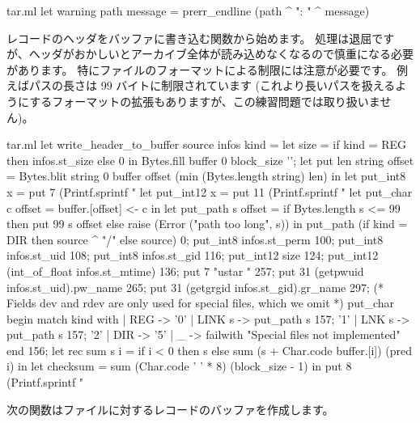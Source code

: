 \begin{answer}
\begin{listingcodefile}{tar.ml}
let warning path message =  prerr_endline (path ^ ": " ^ message)
\end{listingcodefile}
%
レコードのヘッダをバッファに書き込む関数から始めます。
処理は退屈ですが、ヘッダがおかしいとアーカイブ全体が読み込めなくなるので慎重になる必要があります。
特にファイルのフォーマットによる制限には注意が必要です。
例えばパスの長さは 99 バイトに制限されています
(これより長いパスを扱えるようにするフォーマットの拡張もありますが、この練習問題では取り扱いません)。
%
\begin{listingcodefile}{tar.ml}
let write_header_to_buffer source infos kind =
  let size = if kind = REG then infos.st_size else 0 in
  Bytes.fill buffer 0 block_size '';
  let put len string offset =
    Bytes.blit string 0 buffer offset (min (Bytes.length string) len) in
  let put_int8 x = put 7 (Printf.sprintf "%
  let put_int12 x = put 11 (Printf.sprintf "%
  let put_char c offset = buffer.[offset] <- c in
  let put_path s offset =
    if Bytes.length s <= 99 then put 99 s offset
    else raise (Error ("path too long", s)) in
  put_path (if kind = DIR then source ^ "/" else source) 0;
  put_int8 infos.st_perm 100;
  put_int8 infos.st_uid 108;
  put_int8 infos.st_gid 116;
  put_int12 size 124;
  put_int12 (int_of_float infos.st_mtime) 136;
  put 7 "ustar  " 257;
  put 31 (getpwuid infos.st_uid).pw_name 265;
  put 31 (getgrgid infos.st_gid).gr_name 297;
  (* Fields dev and rdev are only used for special files, which we omit *)
  put_char
    begin match kind with
    | REG -> '0'
    | LINK s -> put_path s 157; '1'
    | LNK s ->  put_path s 157; '2'
    | DIR -> '5'
    | _ -> failwith "Special files not implemented"
    end 156;
  let rec sum s i =
    if i < 0 then s else sum (s + Char.code buffer.[i]) (pred i) in
  let checksum = sum (Char.code ' ' * 8) (block_size - 1)  in
  put 8 (Printf.sprintf "%
\end{listingcodefile}
%
次の関数はファイルに対するレコードのバッファを作成します。

\end{answer}
